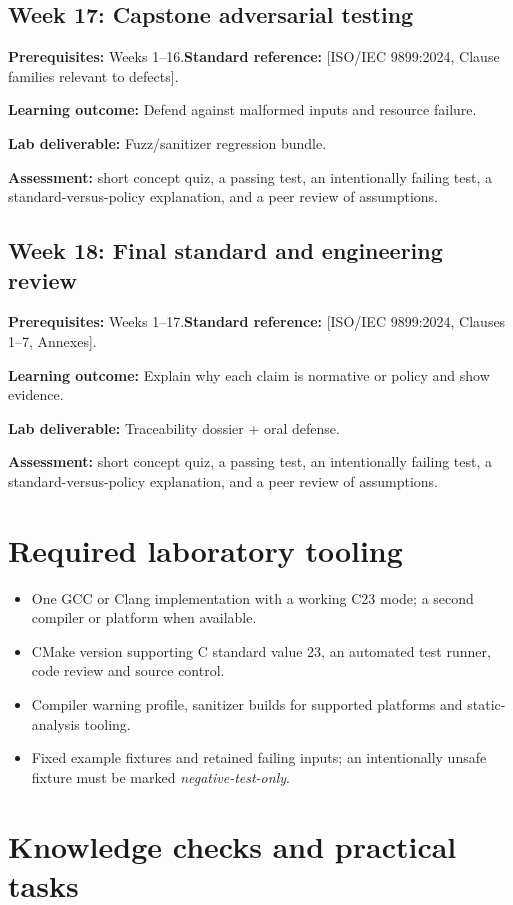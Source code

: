 \documentclass[10pt,letterpaper,oneside]{report}
\newcommand{\refcl}[1]{\textsf{\footnotesize[ISO/IEC 9899:2024, #1]}}
\begin{document}
\section{Week 17: Capstone adversarial testing}
\textbf{Prerequisites:} Weeks 1--16.\quad \textbf{Standard reference:} \refcl{Clause families relevant to defects}.\par\textbf{Learning outcome:} Defend against malformed inputs and resource failure.\par\textbf{Lab deliverable:} Fuzz/sanitizer regression bundle.\par\textbf{Assessment:} short concept quiz, a passing test, an intentionally failing test, a standard-versus-policy explanation, and a peer review of assumptions.

\section{Week 18: Final standard and engineering review}
\textbf{Prerequisites:} Weeks 1--17.\quad \textbf{Standard reference:} \refcl{Clauses 1--7, Annexes}.\par\textbf{Learning outcome:} Explain why each claim is normative or policy and show evidence.\par\textbf{Lab deliverable:} Traceability dossier + oral defense.\par\textbf{Assessment:} short concept quiz, a passing test, an intentionally failing test, a standard-versus-policy explanation, and a peer review of assumptions.

\chapter{Required laboratory tooling}
\begin{itemize}
\item One GCC or Clang implementation with a working C23 mode; a second compiler or platform when available.
\item CMake version supporting C standard value 23, an automated test runner, code review and source control.
\item Compiler warning profile, sanitizer builds for supported platforms and static-analysis tooling.
\item Fixed example fixtures and retained failing inputs; an intentionally unsafe fixture must be marked \emph{negative-test-only}.
\end{itemize}
\chapter{Knowledge checks and practical tasks}
\end{document}
